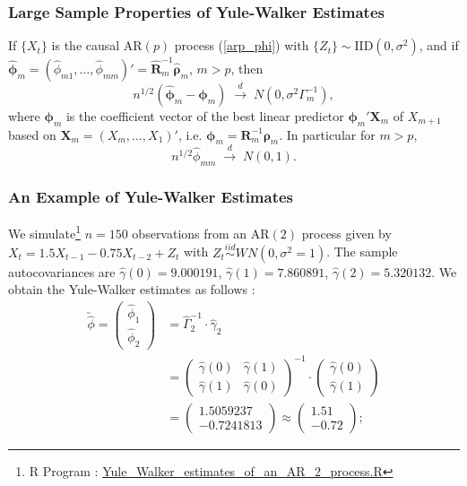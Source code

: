 \documentclass[11pt, a4paper]{article}
\numberwithin{equation}{section}
\theoremstyle{definition}
\begin{document}
\subsubsection{Large Sample Properties of Yule-Walker Estimates}

If $\{X_t\}$ is the causal AR$(p)$ process (\ref{arp_phi}) with $\{Z_t\}\sim \text{IID}(0,\sigma^2)$, and if $\hat{\boldsymbol{\phi}}_m = (\hat{\phi}_{m1},\ldots,\hat{\phi}_{mm})' = \hat{\mathbf{R}}_m^{-1}\hat{\boldsymbol{\rho}}_m$, $m>p$, then
\[
n^{1/2}(\hat{\boldsymbol{\phi}}_m - \boldsymbol{\phi}_m) \; \overset{d}{\rightarrow}\; N(0,\sigma^2 \Gamma_m^{-1}),
\]
where $\boldsymbol{\phi}_m$ is the coefficient vector of the best linear predictor $\boldsymbol{\phi}_m' \mathbf{X}_m$ of $X_{m+1}$ based on 
$\mathbf{X}_m = (X_m,\ldots,X_1)'$, i.e. $\boldsymbol{\phi}_m = \mathbf{R}_m^{-1}\boldsymbol{\rho}_m$. In particular for $m>p$,
\[
n^{1/2}\hat{\phi}_{mm} \;\overset{d}{\rightarrow}\; N(0,1).
\]

\subsubsection{An Example of Yule-Walker Estimates}

\fcChick[scale = 0.4, draw = yellow, line width = 1.5] We simulate\footnote{R Program : \href{https://raw.githubusercontent.com/sakunisgithub/Time_Series_Analysis/refs/heads/master/R_Programs/Yule_Walker_estimates_of_an_AR_2_process.R}{Yule\_Walker\_estimates\_of\_an\_AR\_2\_process.R}} $n = 150$ observations from an AR$(2)$ process given by $X_t = 1.5 X_{t-1} - 0.75X_{t-2} + Z_t$ with $Z_t \overset{iid}{\sim} WN(0, \sigma^2 = 1)$. The sample autocovariances are $\hat{\gamma}(0) = 9.000191$, $\hat{\gamma}(1) = 7.860891$, $\hat{\gamma}(2) = 5.320132$. We obtain the Yule-Walker estimates as follows :
\begin{align*}
\utilde{\hat{\phi}}
=
\begin{pmatrix}
\hat{\phi}_1 \\ \hat{\phi}_2
\end{pmatrix}
&= \widehat{\Gamma}_2^{-1} \cdot \hat{\gamma}_2 \\[0.2em]
&= \begin{pmatrix}
\hat{\gamma}(0) & \hat{\gamma}(1) \\
\hat{\gamma}(1) & \hat{\gamma}(0)
\end{pmatrix}^{-1}
\cdot
\begin{pmatrix}
\hat{\gamma}(0) \\ \hat{\gamma}(1)
\end{pmatrix} \\[0.2em]
&= \begin{pmatrix}
1.5059237 \\ -0.7241813
\end{pmatrix}
\approx \begin{pmatrix}
1.51\\ -0.72
\end{pmatrix};
\end{align*}
\end{document}
